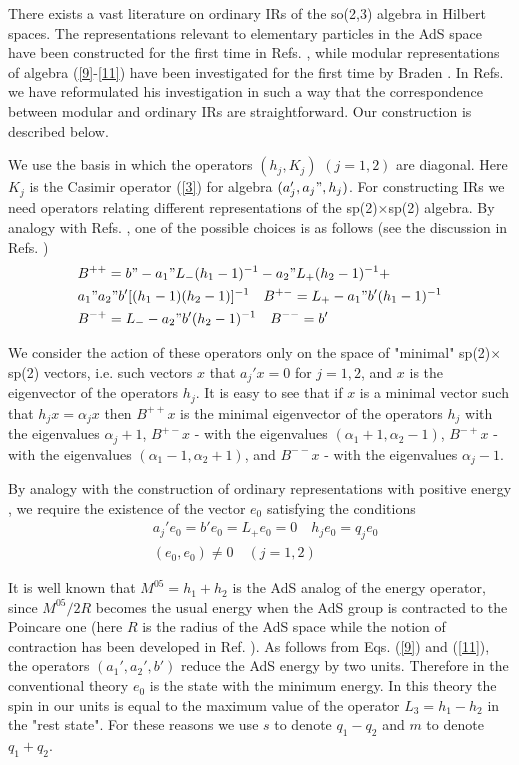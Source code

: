 \documentclass[a4paper,12pt]{article}%
\begin{document}
There exists a vast literature on ordinary IRs of the so(2,3) 
algebra in Hilbert spaces. The representations relevant to 
elementary particles in the AdS space have 
been constructed 
for the first time in Refs. \cite{Fronsdal,Evans}, while 
modular representations of algebra (\ref{9}-\ref{11}) have 
been investigated for the first time by Braden \cite{Braden}. 
In Refs. \cite{lev1,lev2} we have reformulated his 
investigation in such a way that the correspondence between 
modular and ordinary IRs are straightforward. Our construction
is described below. 

We use the basis in which the operators 
$(h_j,K_j)$ $(j=1,2)$ are diagonal. Here $K_j$ is the 
Casimir operator (\ref{3}) for algebra $(a_j',a_j",h_j)$. 
For constructing IRs we need operators relating different
representations of the sp(2)$\times$sp(2) algebra.
By analogy with Refs. \cite{Evans,Braden}, one of the
possible choices is as follows (see the discussion in Refs.
\cite{lev2,lev3})
\begin{eqnarray}
&B^{++}=b"-a_1"L_-(h_1-1)^{-1}-a_2"L_+(h_2-1)^{-1}
+\nonumber\\
&a_1"a_2"b'[(h_1-1)(h_2-1)]^{-1} \quad B^{+-}=L_+-a_1"b'(h_1-1)^{-1}\nonumber\\
&B^{-+}=L_--a_2"b'(h_2-1)^{-1}\quad B^{--}=b'
\label{13}
\end{eqnarray}

We consider the action of these operators only on the 
space of "minimal" 
sp(2)$\times$sp(2) vectors, i.e. such vectors $x$ that 
$a_j'x=0$ for $j=1,2$, and $x$ is the eigenvector of the
operators $h_j$. It is easy to see that if $x$ is a minimal 
vector such that
$h_jx=\alpha_jx$ then $B^{++}x$ is the minimal eigenvector of the
operators $h_j$ with the eigenvalues $\alpha_j+1$, $B^{+-}x$ - 
with the eigenvalues $(\alpha_1+1,\alpha_2-1)$, 
$B^{-+}x$ - with the eigenvalues $(\alpha_1-1,\alpha_2+1)$, 
and $B^{--}x$ - with the eigenvalues $\alpha_j-1$.

By analogy with the construction of ordinary representations with
positive energy \cite{Fronsdal,Evans}, we require the existence
of the vector $e_0$ satisfying the conditions
\begin{eqnarray}
&a_j'e_0=b'e_0=L_+e_0=0\quad h_je_0=q_je_0\nonumber\\
&(e_0,e_0)\neq 0\quad (j=1,2)
\label{14}
\end{eqnarray}

It is well known that $M^{05}=h_1+h_2$ is the AdS analog of 
the energy operator, since $M^{05}/2R$ becomes the usual 
energy when the AdS group is contracted to the Poincare one 
(here $R$ is the radius of the AdS space
while the notion of contraction has been developed in Ref.
\cite{IW}). As follows from 
Eqs. (\ref{9}) and (\ref{11}), the operators $(a_1',a_2',b')$ 
reduce the AdS energy by two units. Therefore in the 
conventional theory
$e_0$ is the state with the minimum energy. In this theory 
the spin in our units is equal to the maximum value of the 
operator $L_3=h_1-h_2$ in the
"rest state". For these reasons we use $s$ to denote $q_1-q_2$
and $m$ to denote $q_1+q_2$. 
\end{document}
